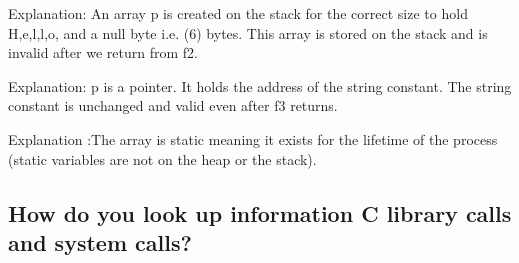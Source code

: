 \begin{Shaded}
\begin{Highlighting}[]
 
    \NormalTok{;}
     
\NormalTok{\} }
\end{Highlighting}
\end{Shaded}

\begin{Shaded}
\begin{Highlighting}[]
     \NormalTok{;}
     
\NormalTok{\} }
\end{Highlighting}
\end{Shaded}

Explanation: An array p is created on the stack for the correct size to
hold H,e,l,l,o, and a null byte i.e. (6) bytes. This array is stored on
the stack and is invalid after we return from f2.

\begin{Shaded}
\begin{Highlighting}[]
     \NormalTok{;}
     
\NormalTok{\} }
\end{Highlighting}
\end{Shaded}

Explanation: p is a pointer. It holds the address of the string
constant. The string constant is unchanged and valid even after f3
returns.

\begin{Shaded}
\begin{Highlighting}[]
      \NormalTok{;}
     
\NormalTok{\} }
\end{Highlighting}
\end{Shaded}

Explanation :The array is static meaning it exists for the lifetime of
the process (static variables are not on the heap or the stack).

\subsection{How do you look up information C library calls and system
calls?}\label{how-do-you-look-up-information-c-library-calls-and-system-calls}

